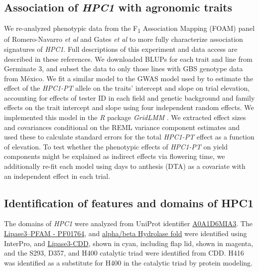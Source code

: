 \documentclass[9pt,twocolumn,twoside,lineno]{biorxiv}
\newcommand{\hpc}{\textit{HPC1}\xspace}
\begin{document}
\subsection{Association of \hpc with agronomic traits}
We re-analyzed phenotypic data from the F\textsubscript{1} Association Mapping (FOAM) panel of Romero-Navarro \textit{et al} \cite{Romero_Navarro2017-cn} and Gates \textit{et al} \cite{Gates2019-xu} to more fully characterize association signatures of \hpc. 
Full descriptions of this experiment and data access are described in these references. 
We downloaded BLUPs for each trait and line from Germinate 3, and subset the data to only those lines with GBS genotype data from M\'exico. 
We fit a similar model to the GWAS model used by \cite{Gates2019-xu} to estimate the effect of the \textit{HPC1-PT} allele on the traits' intercept and slope on trial elevation, accounting for effects of tester ID in each field and genetic background and family effects on the trait intercept and slope using four independent random effects. 
We implemented this model in the \textit{R} package \textit{GridLMM} \cite{Runcie2019-Gr}. 
We extracted effect sizes and covariances conditional on the REML variance component estimates and used these to calculate standard errors for the total \textit{HPC1-PT} effect as a function of elevation. 
To test whether the phenotypic effects of \textit{HPC1-PT} on yield components might be explained as indirect effects via flowering time, we additionally re-fit each model using days to anthesis (DTA) as a covariate with an independent effect in each trial.
\subsection{Identification of features and domains of HPC1}
The domains of \hpc were analyzed from UniProt identifier \hyperlink{https://www.uniprot.org/uniprot/A0A1D6MIA3}{A0A1D6MIA3}. 
The \hyperlink{https://www.ebi.ac.uk/interpro/entry/pfam/PF01764/}{Lipase3--PFAM - PF01764}, and \hyperlink{https://www.ebi.ac.uk/interpro/entry/InterPro/IPR029058/}{alpha/beta Hydrolase fold} were identified using InterPro, and \hyperlink{https://www.ncbi.nlm.nih.gov/Structure/cdd/cddsrv.cgi?uid=cd00519}{Lipase3-CDD}, shown in cyan, including flap lid, shown in magenta, and the S293, D357, and H400 catalytic triad were identified from CDD. 
H416 was identified as a substitute for H400 in the catalytic triad by protein modeling.
\end{document}
